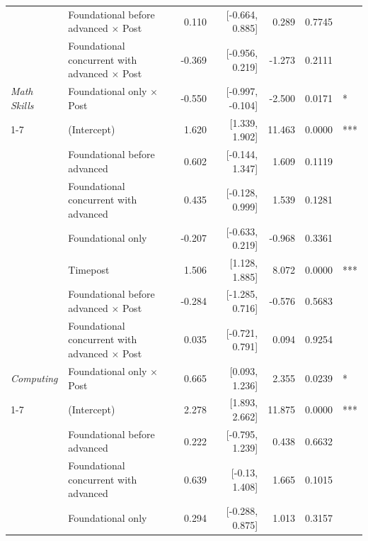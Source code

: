 \begin{table}[!h]
\begin{threeparttable}
\begin{tabular}[t]{>{}llrrrrl}
 & Foundational before advanced $\times$ Post & 0.110 & {}[-0.664, 0.885] & 0.289 & 0.7745 \vphantom{1} & \\

 & Foundational concurrent with advanced $\times$ Post & -0.369 & {}[-0.956, 0.219] & -1.273 & 0.2111 \vphantom{1} & \\

\multirow[t]{-7}{*}[\normalbaselineskip]{\raggedright\arraybackslash \em{Math Skills}} & Foundational only $\times$ Post & -0.550 & {}[-0.997, -0.104] & -2.500 & 0.0171 & \vphantom{1} *\\
\cmidrule{1-7}
 & (Intercept) & 1.620 & {}[1.339, 1.902] & 11.463 & 0.0000 & \vphantom{1} ***\\

 & Foundational before advanced & 0.602 & {}[-0.144, 1.347] & 1.609 & 0.1119 \vphantom{1} & \\

 & Foundational concurrent with advanced & 0.435 & {}[-0.128, 0.999] & 1.539 & 0.1281 \vphantom{1} & \\

 & Foundational only & -0.207 & {}[-0.633, 0.219] & -0.968 & 0.3361 \vphantom{1} & \\

 & Timepost & 1.506 & {}[1.128, 1.885] & 8.072 & 0.0000 & \vphantom{1} ***\\

 & Foundational before advanced $\times$ Post & -0.284 & {}[-1.285, 0.716] & -0.576 & 0.5683 \vphantom{1} & \\

 & Foundational concurrent with advanced $\times$ Post & 0.035 & {}[-0.721, 0.791] & 0.094 & 0.9254 \vphantom{1} & \\

\multirow[t]{-7}{*}[\normalbaselineskip]{\raggedright\arraybackslash \em{Computing}} & Foundational only $\times$ Post & 0.665 & {}[0.093, 1.236] & 2.355 & 0.0239 & \vphantom{1} *\\
\cmidrule{1-7}
 & (Intercept) & 2.278 & {}[1.893, 2.662] & 11.875 & 0.0000 & ***\\

 & Foundational before advanced & 0.222 & {}[-0.795, 1.239] & 0.438 & 0.6632 & \\

 & Foundational concurrent with advanced & 0.639 & {}[-0.13, 1.408] & 1.665 & 0.1015 & \\

 & Foundational only & 0.294 & {}[-0.288, 0.875] & 1.013 & 0.3157 & \\


\end{tabular}
\end{threeparttable}
\end{table}
